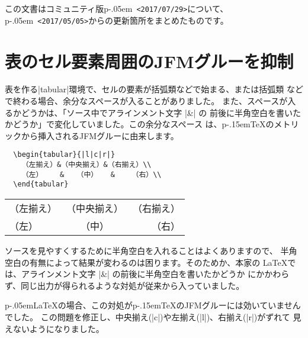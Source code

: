 \documentclass{plnews}
\author{日本語\TeX{}開発コミュニティ（\texttt{https://texjp.org/}）}
\def\pTeX{p\kern-.15em\TeX}
\def\pLaTeX{p\kern-.05em\LaTeX}
\def\pLaTeXe{p\kern-.05em\LaTeXe}
\begin{document}
\maketitle

この文書はコミュニティ版\pLaTeXe\ \texttt{<2017/07/29>}について、
\pLaTeXe\ \texttt{<2017/05/05>}からの更新箇所をまとめたものです。


\section{表のセル要素周囲のJFMグルーを抑制}
表を作る|tabular|環境で、セルの要素が括弧類などで始まる、または括弧類
などで終わる場合、余分なスペースが入ることがありました。
また、スペースが入るかどうかは、「ソース中でアラインメント文字 |&| の
前後に半角空白を書いたかどうか」で変化していました。この余分なスペース
は、\pTeX{}のメトリックから挿入されるJFMグルーに由来します。

\begin{verbatim}
  \begin{tabular}{|l|c|r|}
    （左揃え）&（中央揃え）&（右揃え）\\
    （左）    &   （中）   &    （右）\\
  \end{tabular}
\end{verbatim}

\makeatletter
\def\@tabclassz{%
  \ifcase\@lastchclass
    \@acolampacol
  \or
    \@ampacol
  \or
  \or
  \or
    \@addamp
  \or
    \@acolampacol
  \or
    \@firstampfalse\@acol
  \fi
  \edef\@preamble{%
    \@preamble{%
      \ifcase\@chnum
        \hfil\ignorespaces\@sharp\unskip\hfil
      \or
        \hskip1sp\ignorespaces\@sharp\unskip\hfil
      \or
        \hfil\hskip1sp\ignorespaces\@sharp\unskip
      \fi}}}
\makeatother
\DeleteShortVerb{\|}
  \begin{tabular}{|l|c|r|}
    （左揃え）&（中央揃え）&（右揃え）\\
    （左）    &   （中）   &    （右）\\
  \end{tabular}
\MakeShortVerb{\|}
\medskip

ソースを見やすくするために半角空白を入れることはよくありますので、
半角空白の有無によって結果が変わるのは困ります。そのためか、本家の
\LaTeX{}では、アラインメント文字 |&| の前後に半角空白を書いたかどうか
にかかわらず、同じ出力が得られるような対処が従来から入っていました。

\pLaTeX{}の場合、この対処が\pTeX{}のJFMグルーには効いていませんでした。
この問題を修正し、中央揃え(|c|)や左揃え(|l|)、右揃え(|r|)がずれて
見えないようになりました。
\end{document}
